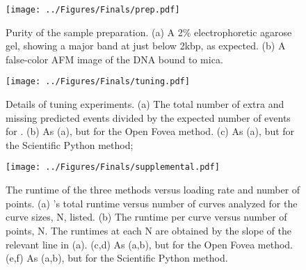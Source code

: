 \begin{figure}
\centering
\texttt{[image: ../Figures/Finals/prep.pdf]}%
\caption[Verification of sample purity]{\noindent{}\pStartF Purity of the sample preparation. (a) A 2\% electrophoretic agarose gel, showing a major band at just below 2kbp, as expected. (b) A false-color AFM image of the DNA bound to mica. \pEndF }
\end{figure}


\begin{figure}
\centering
\texttt{[image: ../Figures/Finals/tuning.pdf]}%
\caption[Cross validation of algorithms and optimal parameters]{\noindent{}\pStartF Details of tuning experiments. (a) The total number of extra and missing predicted events divided by the expected number of events for \name{}. (b) As (a), but for the Open Fovea method. (c) As (a), but for the Scientific Python method; \pEndF }
\end{figure}



\begin{figure}
\centering
\texttt{[image: ../Figures/Finals/supplemental.pdf]}%
\caption[Algorithmic runtime versus loading rate]{\noindent{}\pStartF The runtime of the three methods versus loading rate and number of points. (a) \name{}'s total runtime versus number of curves analyzed for the curve sizes, N, listed. (b) The runtime per curve versus number of points, N. The runtimes at each N are obtained by the slope of the relevant line in (a).  (c,d) As (a,b), but for the Open Fovea method. (e,f) As (a,b), but for the Scientific Python method. \pEndF }
\end{figure}





%

%

%
